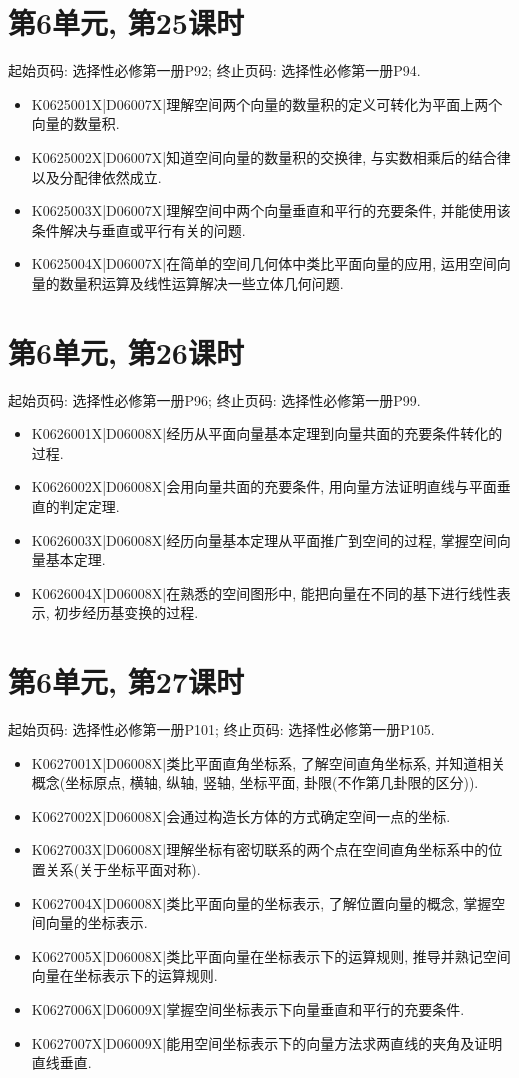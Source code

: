 \section*{第6单元, 第25课时}
起始页码: 选择性必修第一册P92; 终止页码: 选择性必修第一册P94.
\begin{itemize}
\item K0625001X|D06007X|理解空间两个向量的数量积的定义可转化为平面上两个向量的数量积.
\item K0625002X|D06007X|知道空间向量的数量积的交换律, 与实数相乘后的结合律以及分配律依然成立.
\item K0625003X|D06007X|理解空间中两个向量垂直和平行的充要条件, 并能使用该条件解决与垂直或平行有关的问题.
\item K0625004X|D06007X|在简单的空间几何体中类比平面向量的应用, 运用空间向量的数量积运算及线性运算解决一些立体几何问题.
\end{itemize}

\section*{第6单元, 第26课时}
起始页码: 选择性必修第一册P96; 终止页码: 选择性必修第一册P99.
\begin{itemize}
\item K0626001X|D06008X|经历从平面向量基本定理到向量共面的充要条件转化的过程.
\item K0626002X|D06008X|会用向量共面的充要条件, 用向量方法证明直线与平面垂直的判定定理.
\item K0626003X|D06008X|经历向量基本定理从平面推广到空间的过程, 掌握空间向量基本定理.
\item K0626004X|D06008X|在熟悉的空间图形中, 能把向量在不同的基下进行线性表示, 初步经历基变换的过程.
\end{itemize}

\section*{第6单元, 第27课时}
起始页码: 选择性必修第一册P101; 终止页码: 选择性必修第一册P105.
\begin{itemize}
\item K0627001X|D06008X|类比平面直角坐标系, 了解空间直角坐标系, 并知道相关概念(坐标原点, 横轴, 纵轴, 竖轴, 坐标平面, 卦限(不作第几卦限的区分)).
\item K0627002X|D06008X|会通过构造长方体的方式确定空间一点的坐标.
\item K0627003X|D06008X|理解坐标有密切联系的两个点在空间直角坐标系中的位置关系(关于坐标平面对称).
\item K0627004X|D06008X|类比平面向量的坐标表示, 了解位置向量的概念, 掌握空间向量的坐标表示.
\item K0627005X|D06008X|类比平面向量在坐标表示下的运算规则, 推导并熟记空间向量在坐标表示下的运算规则.
\item K0627006X|D06009X|掌握空间坐标表示下向量垂直和平行的充要条件.
\item K0627007X|D06009X|能用空间坐标表示下的向量方法求两直线的夹角及证明直线垂直.
\end{itemize}

